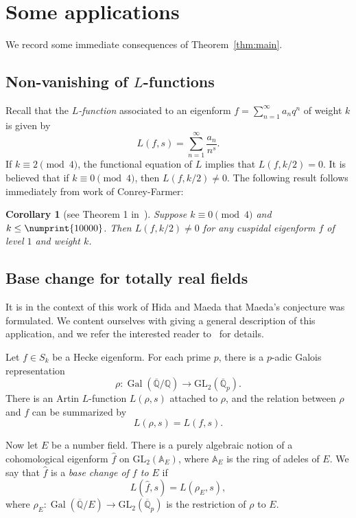 \documentclass[11pt]{article}
\theoremstyle{plain}
\newtheorem{corollary}[theorem]{Corollary}
\theoremstyle{definition}
\theoremstyle{remark}
\numberwithin{equation}{section}
\newcommand{\longto}{\longrightarrow}
\newcommand{\QQ}{\mathbb{Q}}
\newcommand{\Gal}{\operatorname{Gal}}
\newcommand{\bound}{\numprint{10000}}
\newcommand{\GL}{\mathrm{GL}}
\begin{document}
\section{Some applications}

We record some immediate consequences of Theorem~\ref{thm:main}.

\subsection{Non-vanishing of $L$-functions}
Recall that the \emph{$L$-function} associated to an eigenform 
$f=\sum_{n=1}^\infty a_n q^n$ of weight $k$ is given by
\begin{equation*}
  L(f, s)=\sum_{n=1}^\infty \frac{a_n}{n^s}.
\end{equation*}
If $k\equiv 2\pmod{4}$, the functional equation of $L$ implies that
$L(f, k/2)=0$.  It is believed that if $k\equiv 0\pmod{4}$, then $L(f, k/2)\neq
0$.  The following result follows immediately from work of Conrey-Farmer: 

\begin{corollary}[see Theorem 1 in~\cite{ConreyFarmer}]
  Suppose $k\equiv 0\pmod{4}$ and $k\leq\bound$.  Then
  $L(f, k/2)\neq 0$ for any cuspidal eigenform $f$ of level $1$ and weight $k$.
\end{corollary}

\subsection{Base change for totally real fields}
It is in the context of this work of Hida and Maeda that
Maeda's conjecture was formulated.  We content ourselves with giving a general
description of this application, and we refer the interested reader
to~\cite{HidaMaeda} for details. 

Let $f\in S_k$ be a Hecke eigenform.  For each prime $p$, there is a $p$-adic
Galois representation
\begin{equation*}
  \rho\colon\Gal\left(\overline{\QQ}/\QQ\right)
  \longto\GL_2\left(\overline{\QQ}_p\right).
\end{equation*}
There is an Artin $L$-function $L(\rho, s)$ attached to $\rho$, and the
relation between $\rho$ and $f$ can be summarized by
\begin{equation*}
  L(\rho, s) = L(f, s).
\end{equation*}

Now let $E$ be a number field.  There is a purely algebraic notion of a
cohomological eigenform $\hat{f}$ on $\GL_2(\mathbb{A}_E)$, where 
$\mathbb{A}_E$ is the ring
of adeles of $E$.  We say that $\hat{f}$ is a \emph{base change of $f$ to $E$}
if
\begin{equation*}
  L(\hat{f}, s) = L(\rho_E, s),
\end{equation*}
where $\rho_E\colon\Gal(\overline{\QQ}/E)\longto\GL_2(\overline{\QQ}_p)$ is
the restriction of $\rho$ to $E$.
\end{document}
